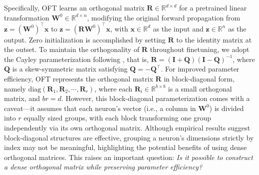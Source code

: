 Specifically, OFT learns an orthogonal matrix $\bm{R}\in\mathbb{R}^{d\times d}$ for a pretrained linear transformation $\bm{W}^0\in\mathbb{R}^{d\times n}$, modifying the original forward propagation from $\bm{z}=(\bm{W}^0)^\top\bm{x}$ to $\bm{z}=(\bm{R}\bm{W}^0)^\top\bm{x}$, with $\bm{x}\in\mathbb{R}^{d}$ as the input and $\bm{z}\in\mathbb{R}^{n}$ as the output. Zero initialization is accomplished by setting $\bm{R}$ to the identity matrix at the outset. To maintain the orthogonality of $\bm{R}$ throughout finetuning, we adopt the Cayley parameterization following \cite{qiu2023controlling,liu2021orthogonal}, that is, $\bm{R}=(\bm{I}+\bm{Q})(\bm{I}-\bm{Q})^{-1}$, where $\bm{Q}$ is a skew-symmetric matrix satisfying $\bm{Q}=-\bm{Q}^\top$. For improved parameter efficiency, OFT represents the orthogonal matrix $\bm{R}$ in block-diagonal form, namely $\text{diag}(\bm{R}_1,\bm{R}_2,\cdots,\bm{R}_r)$, where each $\bm{R}_i\in\mathbb{R}^{b\times b}$ is a small orthogonal matrix, and $br=d$. However, this block-diagonal parameterization comes with a caveat—it assumes that each neuron's vector (i.e., a column in $\bm{W}^0$) is divided into $r$ equally sized groups, with each block transforming one group independently via its own orthogonal matrix. Although empirical results suggest block-diagonal structures are effective, grouping a neuron's dimensions strictly by index may not be meaningful, highlighting the potential benefits of using dense orthogonal matrices. This raises an important question: \emph{Is it possible to construct a dense orthogonal matrix while preserving parameter efficiency?}

